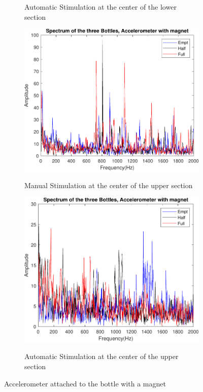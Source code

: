\begin{figure}[]
\begin{subfigure}{0.45\textwidth}
        \caption{Automatic Stimulation at the center of the lower section}{}
        \label{subfig:ResAcImAuBot}
    \end{subfigure}
    \begin{subfigure}{0.45\textwidth}
        \centering
        \includegraphics[width=\linewidth]{Chapters/6CHP/Figures/ResultsSensors/AcImMaTop.pdf}
        \caption{Manual Stimulation at the center of the upper section}{}
        \label{subfig:ResAcImMaTop}
    \end{subfigure}
    \begin{subfigure}{0.45\textwidth}
        \centering
        \includegraphics[width=\linewidth]{Chapters/6CHP/Figures/ResultsSensors/AcImAuTop.pdf}
        \caption{Automatic Stimulation at the center of the upper section}{}
        \label{subfig:ResAcImAuTop}
    \end{subfigure}
    \caption{Accelerometer attached to the bottle with a magnet}{}
    \label{fig:AccMagnet}
\end{figure}
